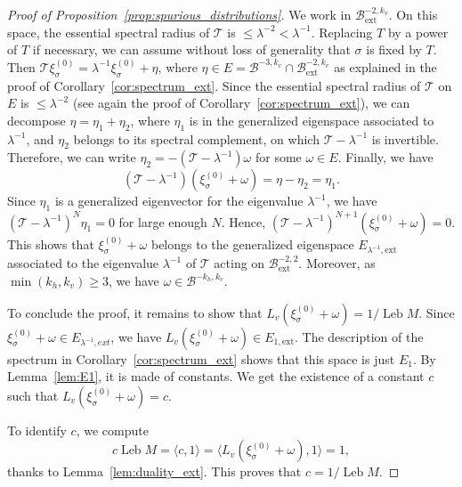 \documentclass[JEP,XML,SOM,Unicode]{cedram}
\newcommand{\ext}{\mathrm{ext}}
\newcommand{\boB}{\mathcal{B}}
\newcommand{\boT}{\mathcal{T}}
\DeclareMathOperator{\Leb}{Leb}
\theoremstyle{definition}
\numberwithin{equation}{section}
\begin{document}
\begin{proof}[Proof of Proposition~\ref{prop:spurious_distributions}]
We work in $\boB_{\ext}^{-2, k_v}$. On this space, the essential spectral
radius of $\boT$ is $\leq \lambda^{-2} < \lambda^{-1}$. Replacing $T$ by a
power of $T$ if necessary, we can assume without loss of generality that
$\sigma$ is fixed by $T$. Then $\boT \xi^{(0)}_\sigma = \lambda^{-1}
\xi^{(0)}_\sigma + \eta$, where $\eta \in E = \boB^{-3, k_v} \cap
\boB_{\ext}^{-2,k_v}$ as explained in the proof of
Corollary~\ref{cor:spectrum_ext}. Since the essential spectral radius of
$\boT$ on $E$ is $\leq \lambda^{-2}$ (see again the proof of
Corollary~\ref{cor:spectrum_ext}), we can decompose $\eta = \eta_1 + \eta_2$, where $\eta_1$ is in the generalized eigenspace associated to $\lambda^{-1}$,
and $\eta_2$ belongs to its spectral complement, on which $\boT-\lambda^{-1}$
is invertible. Therefore, we can write $\eta_2 = -(\boT-\lambda^{-1}) \omega$
for some $\omega \in E$. Finally, we have
\begin{equation*}
(\boT - \lambda^{-1}) (\xi^{(0)}_\sigma + \omega) = \eta - \eta_2 = \eta_1.
\end{equation*}
Since $\eta_1$ is a generalized eigenvector for the eigenvalue
$\lambda^{-1}$, we have $(\boT-\lambda^{-1})^N \eta_1 = 0$ for large enough
$N$. Hence, $(\boT - \lambda^{-1})^{N+1} (\xi^{(0)}_\sigma + \omega) = 0$.
This shows that $\xi^{(0)}_\sigma + \omega$ belongs to the generalized
eigenspace $E_{\lambda^{-1}, \ext}$ associated to the eigenvalue
$\lambda^{-1}$ of $\boT$ acting on $\boB^{-2, 2}_{\ext}$. Moreover, as
$\min(k_h, k_v)\geq 3$, we have $\omega \in \boB^{-k_h, k_v}$.

To conclude the proof, it remains to show that $L_v(\xi^{(0)}_\sigma +
\omega) = 1/\Leb M$. Since $\xi^{(0)}_\sigma + \omega \in E_{\lambda^{-1},
ext}$, we have $L_v(\xi^{(0)}_\sigma + \omega) \in E_{1,\ext}$. The
description of the spectrum in Corollary~\ref{cor:spectrum_ext} shows that
this space is just $E_1$. By Lemma~\ref{lem:E1}, it is made of constants. We
get the existence of a constant $c$ such that $L_v(\xi^{(0)}_\sigma + \omega)
= c$.

To identify $c$, we compute
\begin{equation*}
c \Leb M = \langle c, 1 \rangle = \langle L_v(\xi^{(0)}_\sigma + \omega), 1\rangle
= 1,
\end{equation*}
thanks to Lemma~\ref{lem:duality_ext}. This proves that $c = 1/\Leb M$.
\end{proof}
\end{document}
